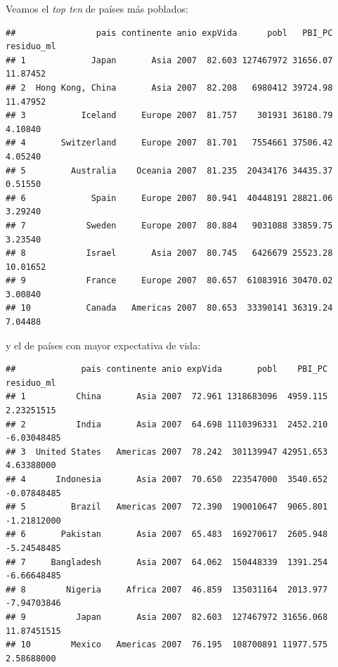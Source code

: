 \documentclass[spanish,]{book}
\newenvironment{Shaded}{\begin{snugshade}}{\end{snugshade}}
\newcommand{\DataTypeTok}[1]{\textcolor[rgb]{0.13,0.29,0.53}{#1}}
\newcommand{\DecValTok}[1]{\textcolor[rgb]{0.00,0.00,0.81}{#1}}
\newcommand{\KeywordTok}[1]{\textcolor[rgb]{0.13,0.29,0.53}{\textbf{#1}}}
\newcommand{\NormalTok}[1]{#1}
\newcommand{\OperatorTok}[1]{\textcolor[rgb]{0.81,0.36,0.00}{\textbf{#1}}}
\newcommand{\StringTok}[1]{\textcolor[rgb]{0.31,0.60,0.02}{#1}}
\begin{document}
Veamos el \emph{top ten} de países más poblados:

\begin{Shaded}
\end{Shaded}

\begin{verbatim}
##                pais continente anio expVida      pobl   PBI_PC residuo_ml
## 1             Japan       Asia 2007  82.603 127467972 31656.07   11.87452
## 2  Hong Kong, China       Asia 2007  82.208   6980412 39724.98   11.47952
## 3           Iceland     Europe 2007  81.757    301931 36180.79    4.10840
## 4       Switzerland     Europe 2007  81.701   7554661 37506.42    4.05240
## 5         Australia    Oceania 2007  81.235  20434176 34435.37    0.51550
## 6             Spain     Europe 2007  80.941  40448191 28821.06    3.29240
## 7            Sweden     Europe 2007  80.884   9031088 33859.75    3.23540
## 8            Israel       Asia 2007  80.745   6426679 25523.28   10.01652
## 9            France     Europe 2007  80.657  61083916 30470.02    3.00840
## 10           Canada   Americas 2007  80.653  33390141 36319.24    7.04488
\end{verbatim}

y el de países con mayor expectativa de vida:

\begin{Shaded}
\end{Shaded}

\begin{verbatim}
##             pais continente anio expVida       pobl    PBI_PC  residuo_ml
## 1          China       Asia 2007  72.961 1318683096  4959.115  2.23251515
## 2          India       Asia 2007  64.698 1110396331  2452.210 -6.03048485
## 3  United States   Americas 2007  78.242  301139947 42951.653  4.63388000
## 4      Indonesia       Asia 2007  70.650  223547000  3540.652 -0.07848485
## 5         Brazil   Americas 2007  72.390  190010647  9065.801 -1.21812000
## 6       Pakistan       Asia 2007  65.483  169270617  2605.948 -5.24548485
## 7     Bangladesh       Asia 2007  64.062  150448339  1391.254 -6.66648485
## 8        Nigeria     Africa 2007  46.859  135031164  2013.977 -7.94703846
## 9          Japan       Asia 2007  82.603  127467972 31656.068 11.87451515
## 10        Mexico   Americas 2007  76.195  108700891 11977.575  2.58688000
\end{verbatim}
\end{document}
